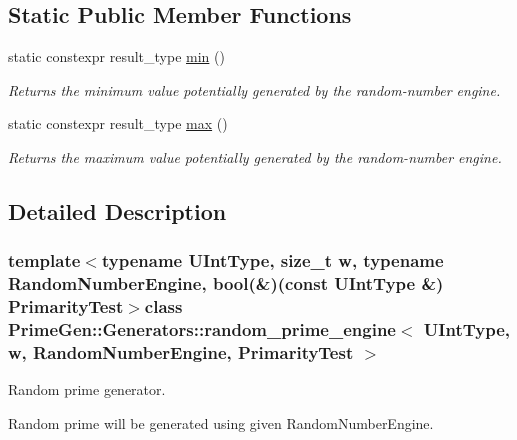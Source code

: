 \subsection*{Static Public Member Functions}
\begin{DoxyCompactItemize}
\item 
static constexpr result\+\_\+type \hyperlink{class_prime_gen_1_1_generators_1_1random__prime__engine_aca7cba717ac90823ba325c6e4d79d1a2}{min} ()
\begin{DoxyCompactList}\small\item\em Returns the minimum value potentially generated by the random-\/number engine. \end{DoxyCompactList}\item 
static constexpr result\+\_\+type \hyperlink{class_prime_gen_1_1_generators_1_1random__prime__engine_a123bf5e419910ff9b04916408fbdd228}{max} ()
\begin{DoxyCompactList}\small\item\em Returns the maximum value potentially generated by the random-\/number engine. \end{DoxyCompactList}\end{DoxyCompactItemize}


\subsection{Detailed Description}
\subsubsection*{template$<$typename U\+Int\+Type, size\+\_\+t w, typename Random\+Number\+Engine, bool(\&)(const U\+Int\+Type \&) Primarity\+Test$>$class Prime\+Gen\+::\+Generators\+::random\+\_\+prime\+\_\+engine$<$ U\+Int\+Type, w, Random\+Number\+Engine, Primarity\+Test $>$}

Random prime generator. 

Random prime will be generated using given {\ttfamily Random\+Number\+Engine}.


